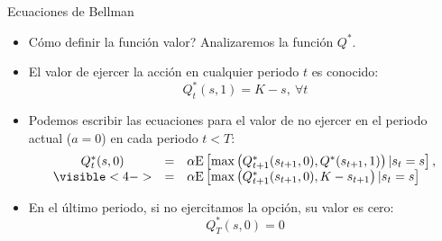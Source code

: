 \documentclass[handout]{beamer}
\begin{document}
\begin{frame}{Ecuaciones de Bellman}
\begin{itemize}
\item Cómo definir la función valor? Analizaremos la función $Q^*$.
\item<2-> El valor de ejercer la acción en cualquier periodo $t$ es conocido:
$$
Q_t^*(s,1) = K-s,~\forall t
$$
\item<3-> Podemos escribir las ecuaciones para el valor de no ejercer en el periodo actual ($a=0$) en cada periodo $t<T$:
$$
\begin{array}{ccl}
Q_t^*(s,0) & = & \alpha {\rm E}\left[\max\left(Q_{t+1}^*(s_{t+1},0),Q^*(s_{t+1},1)\right) | s_t = s \right], \\
\visible<4-> & = & \alpha{\rm E}\left[\max\left(Q_{t+1}^*(s_{t+1},0),K-s_{t+1}\right) | s_t = s \right]
\end{array}
$$
\item<5-> En el último periodo, si no ejercitamos la opción, su valor es cero:
$$
Q_T^*(s,0) = 0
$$
\end{itemize}    
\end{frame}
\end{document}
